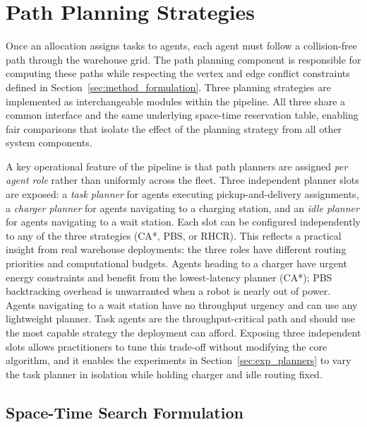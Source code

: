 \section{Path Planning Strategies}
\label{sec:method_collision}

Once an allocation assigns tasks to agents, each agent must follow a
collision-free path through the warehouse grid.
The path planning component is responsible for computing these paths while
respecting the vertex and edge conflict constraints defined in
Section~\ref{sec:method_formulation}.
Three planning strategies are implemented as interchangeable modules within the
pipeline.
All three share a common interface and the same underlying space-time reservation
table, enabling fair comparisons that isolate the effect of the planning
strategy from all other system components.

A key operational feature of the pipeline is that path planners are
assigned \emph{per agent role} rather than uniformly across the fleet.
Three independent planner slots are exposed:
a \emph{task planner} for agents executing pickup-and-delivery assignments,
a \emph{charger planner} for agents navigating to a charging station, and
an \emph{idle planner} for agents navigating to a wait station.
Each slot can be configured independently to any of the three strategies
(CA*, PBS, or RHCR).
This reflects a practical insight from real warehouse deployments: the
three roles have different routing priorities and computational budgets.
Agents heading to a charger have urgent energy constraints and benefit from
the lowest-latency planner (CA*); PBS backtracking overhead is unwarranted
when a robot is nearly out of power.
Agents navigating to a wait station have no throughput urgency and can use
any lightweight planner.
Task agents are the throughput-critical path and should use the most capable
strategy the deployment can afford.
Exposing three independent slots allows practitioners to tune this
trade-off without modifying the core algorithm, and it enables the
experiments in Section~\ref{sec:exp_planners} to vary the task planner in
isolation while holding charger and idle routing fixed.


\subsection{Space-Time Search Formulation}
\label{subsec:method_spacetime}


